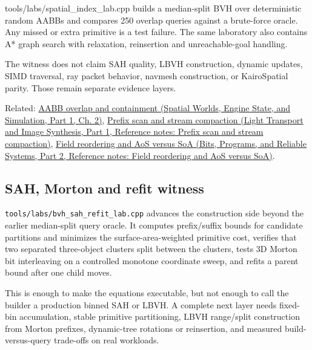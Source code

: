 \hypertarget{appendix-5653a7aea6bb-executable-reference}{}

tools/labs/spatial\_index\_lab.cpp builds a median-split BVH over deterministic random AABBs and compares 250 overlap queries against a brute-force oracle. Any missed or extra primitive is a test failure. The same laboratory also contains A* graph search with relaxation, reinsertion and unreachable-goal handling.

The witness does not claim SAH quality, LBVH construction, dynamic updates, SIMD traversal, ray packet behavior, navmesh construction, or KairoSpatial parity. Those remain separate evidence layers.

Related: \href{../05-Spatial-Worlds-Engine-State-and-Simulation-P01/main.pdf\#nameddest=03-visual-computing-i-ch021-axis-aligned-bounding-boxes}{AABB overlap and containment (Spatial Worlds, Engine State, and Simulation, Part 1, Ch. 2)}, \href{../04-Light-Transport-and-Image-Synthesis-P01/main.pdf\#nameddest=appendix-f2ee4d086415}{Prefix scan and stream compaction (Light Transport and Image Synthesis, Part 1, Reference notes: Prefix scan and stream compaction)}, \href{../01-Bits-Programs-and-Reliable-Systems-P02/main.pdf\#nameddest=appendix-5522ad176ca0}{Field reordering and AoS versus SoA (Bits, Programs, and Reliable Systems, Part 2, Reference notes: Field reordering and AoS versus SoA)}.

\subsection{SAH, Morton and refit witness}\label{appendix-5653a7aea6bb-sah-morton-and-refit-witness}

\hypertarget{appendix-5653a7aea6bb-sah-morton-and-refit-witness}{}

\texttt{tools/labs/bvh\_sah\_refit\_lab.cpp} advances the construction side beyond the earlier median-split query oracle. It computes prefix/suffix bounds for candidate partitions and minimizes the surface-area-weighted primitive cost, verifies that two separated three-object clusters split between the clusters, tests 3D Morton bit interleaving on a controlled monotone coordinate sweep, and refits a parent bound after one child moves.

This is enough to make the equations executable, but not enough to call the builder a production binned SAH or LBVH. A complete next layer needs fixed-bin accumulation, stable primitive partitioning, LBVH range/split construction from Morton prefixes, dynamic-tree rotations or reinsertion, and measured build-versus-query trade-offs on real workloads.
